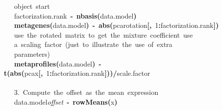 \documentclass[a4paper]{article}\usepackage{graphicx, color}
\makeatletter
\newcommand{\hlnumber}[1]{\textcolor[rgb]{0,0,0}{#1}}%
\newcommand{\hlfunctioncall}[1]{\textcolor[rgb]{0.501960784313725,0,0.329411764705882}{\textbf{#1}}}%
\newcommand{\hlkeyword}[1]{\textcolor[rgb]{0,0,0}{\textbf{#1}}}%
\newcommand{\hlcomment}[1]{\textcolor[rgb]{0.180392156862745,0.6,0.341176470588235}{#1}}%
\newcommand{\hlassignement}[1]{\textcolor[rgb]{0,0,0}{\textbf{#1}}}%
\newcommand{\hlslot}[1]{\textit{#1}}%
\newcommand{\hlsymbol}[1]{\textcolor[rgb]{0,0,0}{#1}}%
\newcommand{\hlstd}[1]{\textcolor[rgb]{0,0,0}{#1}}%
\newenvironment{kframe}{%
 \def\FrameCommand##1{\hskip\@totalleftmargin \hskip-\fboxsep
 \colorbox{shadecolor}{##1}\hskip-\fboxsep
     \hskip-\linewidth \hskip-\@totalleftmargin \hskip\columnwidth}%
 \MakeFramed {\advance\hsize-\width
   \@totalleftmargin\z@ \linewidth\hsize
   \@setminipage}}%
 {\par\unskip\endMakeFramed}
\newenvironment{knitrout}{}{} %
\makeatother
\begin{document}
\begin{knitrout}
\begin{kframe}
\begin{flushleft}
\hlstd{}{\ }{\ }{\ }{\ }\hlcomment{\usebox{\hlnormalsizeboxhash}{\ }object{\ }\usebox{\hlnormalsizeboxsinglequote}start\usebox{\hlnormalsizeboxsinglequote}}\hspace*{\fill}\\
\hlstd{}{\ }{\ }{\ }{\ }\hlsymbol{factorization.rank}{\ }\hlassignement{\usebox{\hlnormalsizeboxlessthan}-}{\ }\hlfunctioncall{nbasis}\hlkeyword{(}\hlsymbol{data.model}\hlkeyword{)}\hspace*{\fill}\\
\hlstd{}{\ }{\ }{\ }{\ }\hlfunctioncall{metagenes}\hlkeyword{(}\hlsymbol{data.model}\hlkeyword{)}{\ }\hlassignement{\usebox{\hlnormalsizeboxlessthan}-}{\ }\hlfunctioncall{abs}\hlkeyword{(}\hlsymbol{pca}\hlkeyword{\usebox{\hlnormalsizeboxdollar}}\hlsymbol{rotation}\hlkeyword{[}\hlkeyword{,}{\ }\hlnumber{1}\hlkeyword{:}\hlsymbol{factorization.rank}\hlkeyword{]}\hlkeyword{)}\hspace*{\fill}\\
\hlstd{}{\ }{\ }{\ }{\ }\hlcomment{\usebox{\hlnormalsizeboxhash}{\ }use{\ }the{\ }rotated{\ }matrix{\ }to{\ }get{\ }the{\ }mixture{\ }coefficient{\ }use}\hspace*{\fill}\\
\hlstd{}{\ }{\ }{\ }{\ }\hlcomment{\usebox{\hlnormalsizeboxhash}{\ }a{\ }scaling{\ }factor{\ }(just{\ }to{\ }illustrate{\ }the{\ }use{\ }of{\ }extra}\hspace*{\fill}\\
\hlstd{}{\ }{\ }{\ }{\ }\hlcomment{\usebox{\hlnormalsizeboxhash}{\ }parameters)}\hspace*{\fill}\\
\hlstd{}{\ }{\ }{\ }{\ }\hlfunctioncall{metaprofiles}\hlkeyword{(}\hlsymbol{data.model}\hlkeyword{)}{\ }\hlassignement{\usebox{\hlnormalsizeboxlessthan}-}{\ }\hlfunctioncall{t}\hlkeyword{(}\hlfunctioncall{abs}\hlkeyword{(}\hlsymbol{pca}\hlkeyword{\usebox{\hlnormalsizeboxdollar}}\hlsymbol{x}\hlkeyword{[}\hlkeyword{,}{\ }\hlnumber{1}\hlkeyword{:}\hlsymbol{factorization.rank}\hlkeyword{]}\hlkeyword{)}\hlkeyword{)}\hlkeyword{/}\hlsymbol{scale.factor}\hspace*{\fill}\\
\hlstd{}\hspace*{\fill}\\
\hlstd{}{\ }{\ }{\ }{\ }\hlcomment{\usebox{\hlnormalsizeboxhash}{\ }3.{\ }Compute{\ }the{\ }offset{\ }as{\ }the{\ }mean{\ }expression}\hspace*{\fill}\\
\hlstd{}{\ }{\ }{\ }{\ }\hlsymbol{data.model}\hlkeyword{\usebox{\hlnormalsizeboxat}}\hlslot{offset}{\ }\hlassignement{\usebox{\hlnormalsizeboxlessthan}-}{\ }\hlfunctioncall{rowMeans}\hlkeyword{(}\hlsymbol{x}\hlkeyword{)}\hspace*{\fill}\\

\end{flushleft}
\end{kframe}
\end{knitrout}
\end{document}
